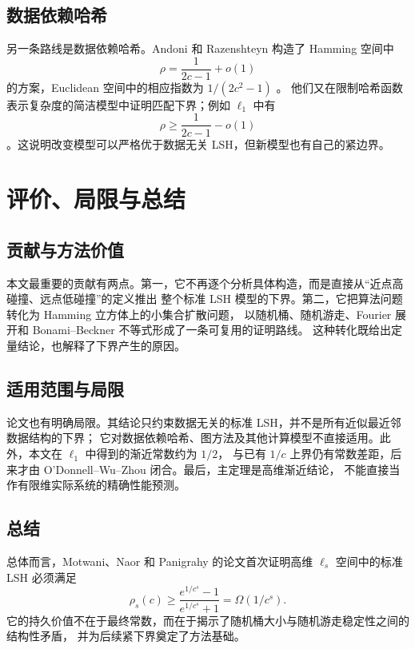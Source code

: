 \documentclass[UTF8,11pt,a4paper]{ctexart}
\begin{document}
\subsection{数据依赖哈希}

另一条路线是数据依赖哈希。Andoni 和 Razenshteyn 构造了 Hamming 空间中
\[
  \rho=\frac{1}{2c-1}+o(1)
\]
的方案，Euclidean 空间中的相应指数为 $1/(2c^2-1)$ \cite{andoni2015datadependent}。
他们又在限制哈希函数表示复杂度的简洁模型中证明匹配下界；例如 $\ell_1$ 中有
\[
  \rho\ge\frac{1}{2c-1}-o(1)
\]
\cite{andoni2016lower}。这说明改变模型可以严格优于数据无关 LSH，但新模型也有自己的紧边界。

\section{评价、局限与总结}

\subsection{贡献与方法价值}

本文最重要的贡献有两点。第一，它不再逐个分析具体构造，而是直接从“近点高碰撞、远点低碰撞”的定义推出
整个标准 LSH 模型的下界。第二，它把算法问题转化为 Hamming 立方体上的小集合扩散问题，
以随机桶、随机游走、Fourier 展开和 Bonami--Beckner 不等式形成了一条可复用的证明路线。
这种转化既给出定量结论，也解释了下界产生的原因。

\subsection{适用范围与局限}

论文也有明确局限。其结论只约束数据无关的标准 LSH，并不是所有近似最近邻数据结构的下界；
它对数据依赖哈希、图方法及其他计算模型不直接适用。此外，本文在 $\ell_1$ 中得到的渐近常数约为 $1/2$，
与已有 $1/c$ 上界仍有常数差距，后来才由 O'Donnell--Wu--Zhou 闭合。最后，主定理是高维渐近结论，
不能直接当作有限维实际系统的精确性能预测。

\subsection{总结}

总体而言，Motwani、Naor 和 Panigrahy 的论文首次证明高维 $\ell_s$ 空间中的标准 LSH 必须满足
\[
  \rho_s(c)
  \ge
  \frac{e^{1/c^s}-1}{e^{1/c^s}+1}
  =
  \Omega(1/c^s).
\]
它的持久价值不在于最终常数，而在于揭示了随机桶大小与随机游走稳定性之间的结构性矛盾，
并为后续紧下界奠定了方法基础。
\end{document}
